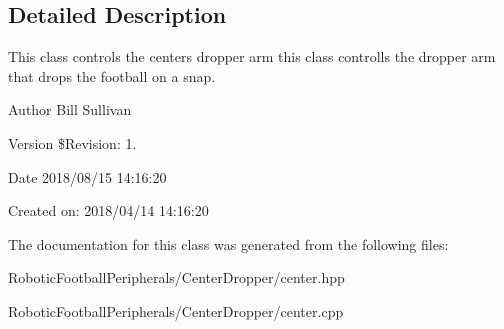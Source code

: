 \subsection{Detailed Description}
This class controls the centers dropper arm this class controlls the dropper arm that drops the football on a snap. 

\begin{DoxyAuthor}{Author}
Bill Sullivan
\end{DoxyAuthor}
\begin{DoxyVersion}{Version}
\$\+Revision\+: 1.
\end{DoxyVersion}
\begin{DoxyDate}{Date}
2018/08/15 14\+:16\+:20
\end{DoxyDate}
Created on\+: 2018/04/14 14\+:16\+:20 

The documentation for this class was generated from the following files\+:\begin{DoxyCompactItemize}
\item 
Robotic\+Football\+Peripherals/\+Center\+Dropper/center.\+hpp\item 
Robotic\+Football\+Peripherals/\+Center\+Dropper/center.\+cpp\end{DoxyCompactItemize}
